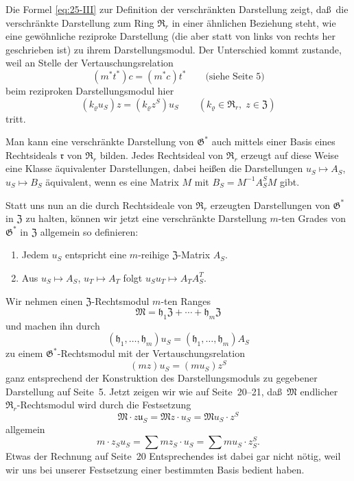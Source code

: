 \documentclass[12pt,a4paper]{article}
\theoremstyle{plain}
\theoremstyle{definition}
\theoremstyle{remark}
\begin{document}
Die Formel \eqref{eq:25-III} zur Definition der verschr\"ankten Darstellung zeigt,
da\ss\ die verschr\"ankte Darstellung zum Ring $\mathfrak{R}_{r}$ in einer \"ahnlichen
Beziehung steht, wie eine gew\"ohnliche reziproke Darstellung (die aber
statt von links von rechts her geschrieben ist) zu ihrem
Darstellungsmodul. Der Unterschied kommt zustande, weil an Stelle der
Vertauschungsrelation
\[
(m^{*}t^{*})c = (m^{*}c)t^{*} \qquad \text{(siehe Seite~5)}
\]
beim reziproken Darstellungsmodul hier
\[
(k_{\varrho}u_{S})z = (k_{\varrho}z^{S})u_{S} \qquad (k_{\varrho} \in \mathfrak{R}_{r},\; z \in \mathfrak{Z})
\]
tritt.

Man kann eine verschr\"ankte Darstellung von $\mathfrak{G}^{*}$ auch mittels einer
Basis eines Rechtsideals $\mathfrak{r}$ von $\mathfrak{R}_{r}$ bilden. Jedes Rechtsideal von
$\mathfrak{R}_{r}$ erzeugt auf diese Weise eine Klasse \"aquivalenter Darstellungen,
dabei hei\ss en die Darstellungen $u_{S} \mapsto A_{S}$, $u_{S} \mapsto B_{S}$
\"aquivalent, wenn es eine Matrix $M$ mit $B_{S} = M^{-1}A_{S}^{S}M$ gibt.

Statt uns nun an die durch Rechtsideale von $\mathfrak{R}_{r}$ erzeugten
Darstellungen von $\mathfrak{G}^{*}$ in $\mathfrak{Z}$ zu halten, k\"onnen wir jetzt eine
verschr\"ankte Darstellung $m$-ten Grades von $\mathfrak{G}^{*}$ in $\mathfrak{Z}$ allgemein
so definieren:
\begin{enumerate}
\item Jedem $u_{S}$ entspricht eine $m$-reihige $\mathfrak{Z}$-Matrix $A_{S}$.
\item Aus $u_{S} \mapsto A_{S}$, $u_{T} \mapsto A_{T}$ folgt
$u_{S}u_{T} \mapsto A_{T}A_{S}^{T}$.
\end{enumerate}
Wir nehmen einen $\mathfrak{Z}$-Rechtsmodul $m$-ten Ranges
\[
\mathfrak{M} = \mathfrak{h}_{1}\mathfrak{Z} + \cdots + \mathfrak{h}_{m}\mathfrak{Z}
\]
und machen ihn durch
\[
(\mathfrak{h}_{1}, \ldots, \mathfrak{h}_{m})u_{S} = (\mathfrak{h}_{1}, \ldots, \mathfrak{h}_{m})A_{S}
\]
zu einem $\mathfrak{G}^{*}$-Rechtsmodul mit der Vertauschungsrelation
\[
(mz)u_{S} = (mu_{S})z^{S}
\]
ganz entsprechend der Konstruktion des Darstellungsmoduls zu gegebener
Darstellung auf Seite~5. Jetzt zeigen wir wie auf Seite~20--21, da\ss\ $\mathfrak{M}$ endlicher $\mathfrak{R}_{r}$-Rechtsmodul wird durch die Festsetzung
\[
\mathfrak{M} \cdot z\mathfrak{u}_{S} = \mathfrak{M}z \cdot u_{S} = \mathfrak{M}u_{S} \cdot z^{S}
\]
allgemein
\[
m \cdot z_{S}u_{S} = \sum m z_{S} \cdot u_{S} = \sum m u_{S} \cdot z_{S}^{S}.
\]
Etwas der Rechnung auf Seite~20 Entsprechendes ist dabei gar nicht
n\"otig, weil wir uns bei unserer Festsetzung einer bestimmten Basis
bedient haben.
\end{document}
